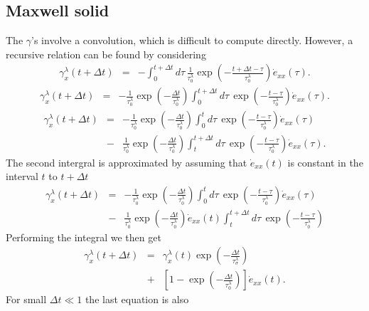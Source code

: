 \documentclass[11pt]{article}
\begin{document}
{\subsection*{Maxwell solid}
The $\gamma$'s involve a convolution, which is difficult to compute directly.
However, a recursive relation can be found by considering
\begin{eqnarray*}
\gamma^{\lambda}_x(t+\Delta t) & = &
  -\int^{t+\Delta t}_0 d\tau\,
  \frac{1}{\tau^{\lambda}_0}
  \exp(-\frac{t+\Delta t -\tau}{\tau^{\lambda}_0})
  \dot{e}_{xx}(\tau).
\end{eqnarray*}
\begin{eqnarray*}
\gamma^{\lambda}_x(t+\Delta t) & = &
  -\frac{1}{\tau^{\lambda}_{0}}
  \exp(-\frac{\Delta t}{\tau^{\lambda}_{0}})
  \int^{t+\Delta t}_{0} d\tau\,
  \exp(-\frac{t-\tau}{\tau^{\lambda}_{0}})
  \dot{e}_{xx}(\tau).
\end{eqnarray*}
\begin{eqnarray*}
\gamma^{\lambda}_x(t+\Delta t) 
 & = & 
  -\frac{1}{\tau^{\lambda}_0}
  \exp(-\frac{\Delta t}{\tau^{\lambda}_{0}})
  \int^{t}_0 d\tau\,
  \exp(-\frac{t-\tau}{\tau^{\lambda}_{0}})
  \dot{e}_{xx}(\tau)\\
 & - &
  \frac{1}{\tau^{\lambda}_{0}}
  \exp(-\frac{\Delta t}{\tau^{\lambda}_{0}})
  \int^{t+\Delta t}_t d\tau\,
  \exp(-\frac{t-\tau}{\tau^{\lambda}_{0}})
  \dot{e}_{xx}(\tau).
\end{eqnarray*}
The second intergral is approximated by
 assuming that $\dot{e}_{xx}(t)$ is constant in the interval $t$ to $t+\Delta t$
\begin{eqnarray*}
\gamma^{\lambda}_x(t+\Delta t) 
 & = & 
  -\frac{1}{\tau^{\lambda}_{0}}
\exp(-\frac{\Delta t}{\tau^{\lambda}_{0}})
       \int^{t}_0 d\tau\,
       \exp(-\frac{t-\tau}{\tau^{\lambda}_{0}})
       \dot{e}_{xx}(\tau)\\
 & - &
       \frac{1}{\tau^{\lambda}_{0}} \exp(-\frac{\Delta t}{\tau^{\lambda}_{0}})
       \dot{e}_{xx}(t)\int^{t+\Delta t}_t d\tau\,
       \exp(-\frac{t-\tau}{\tau^{\lambda}_{0}})
\end{eqnarray*}
Performing the integral we then get
\begin{eqnarray*}
\gamma^{\lambda}_x(t+\Delta t) 
   & = & \gamma^{\lambda}_x (t)\exp(-\frac{\Delta t}{\tau^{\lambda}_{\sigma}}) \\
   & + & 
         \left[1-\exp(-\frac{\Delta t}{\tau^{\lambda}_{0}})\right]
         \dot{e}_{xx}(t).
\end{eqnarray*}
%
For small $\Delta t \ll 1$ the last equation is also
}
\end{document}
